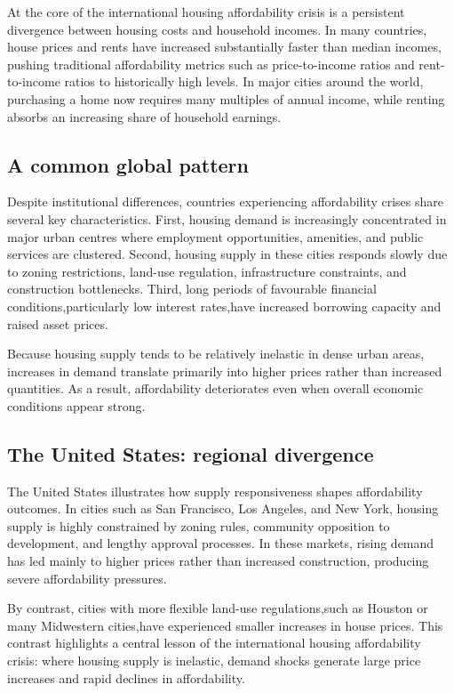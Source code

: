 \documentclass[11pt]{article}
\begin{document}
At the core of the international housing affordability crisis is a persistent divergence between housing costs and household incomes. In many countries, house prices and rents have increased substantially faster than median incomes, pushing traditional affordability metrics such as price-to-income ratios and rent-to-income ratios to historically high levels. In major cities around the world, purchasing a home now requires many multiples of annual income, while renting absorbs an increasing share of household earnings.

\subsection*{A common global pattern}

Despite institutional differences, countries experiencing affordability crises share several key characteristics. First, housing demand is increasingly concentrated in major urban centres where employment opportunities, amenities, and public services are clustered. Second, housing supply in these cities responds slowly due to zoning restrictions, land-use regulation, infrastructure constraints, and construction bottlenecks. Third, long periods of favourable financial conditions,particularly low interest rates,have increased borrowing capacity and raised asset prices.

Because housing supply tends to be relatively inelastic in dense urban areas, increases in demand translate primarily into higher prices rather than increased quantities. As a result, affordability deteriorates even when overall economic conditions appear strong.

\subsection*{The United States: regional divergence}

The United States illustrates how supply responsiveness shapes affordability outcomes. In cities such as San Francisco, Los Angeles, and New York, housing supply is highly constrained by zoning rules, community opposition to development, and lengthy approval processes. In these markets, rising demand has led mainly to higher prices rather than increased construction, producing severe affordability pressures.

By contrast, cities with more flexible land-use regulations,such as Houston or many Midwestern cities,have experienced smaller increases in house prices. This contrast highlights a central lesson of the international housing affordability crisis: where housing supply is inelastic, demand shocks generate large price increases and rapid declines in affordability.
\end{document}
